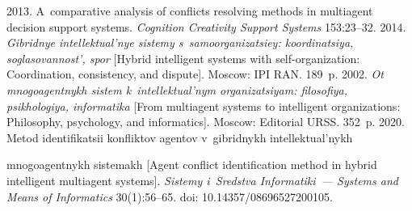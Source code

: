   







   \begin{multicols}{2}

\renewcommand{\bibname}{\protect\rmfamily References}

{\small\frenchspacing
 {%
 \begin{thebibliography}{99}
 
 \vspace*{-2pt}
   
    2013. A~comparative 
analysis of conflicts resolving methods in multiagent decision support systems. \textit{Cognition 
Creativity Support Systems} 153:23--32.
    2014. \textit{Gibridnye 
intellektual'nye sistemy s~samoorganizatsiey: koordinatsiya, soglasovannost', spor} [Hybrid 
intelligent systems with self-organization: Coordination, consistency, and dispute]. Moscow: IPI 
RAN. 189~p.
    2002. \textit{Ot mnogoagentnykh sistem k~intellektual'nym 
organizatsiyam: filosofiya, psikhologiya, informatika} [From multiagent systems to intelligent 
organizations: Philosophy, psychology, and informatics]. Moscow: Editorial URSS. 352~p.
    2020. Metod identifikatsii konfliktov agentov 
v~gibridnykh intellektual'nykh\linebreak\vspace*{-12pt}

\columnbreak

\noindent
 mnogoagentnykh sistemakh [Agent conflict identification method in 
hybrid intelligent multiagent systems]. \textit{Sistemy i~Sredstva Informatiki~--- Systems and 
Means of Informatics} 30(1):56--65. doi: 10.14357/08696527200105.



\end{thebibliography}}}
\end{multicols}

